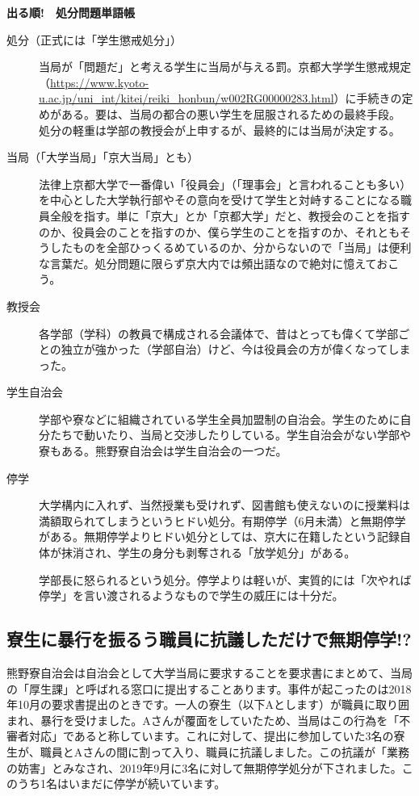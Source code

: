 \begin{shadebox}
{\large\textbf{出る順!　処分問題単語帳}}
\begin{description}
    \item[処分（正式には「学生懲戒処分」）] 当局が「問題だ」と考える学生に当局が与える罰。京都大学学生懲戒規定（\url{https://www.kyoto-u.ac.jp/uni_int/kitei/reiki_honbun/w002RG00000283.html}）に手続きの定めがある。要は、当局の都合の悪い学生を屈服されるための最終手段。 処分の軽重は学部の教授会が上申するが、最終的には当局が決定する。
    \item[当局（「大学当局」「京大当局」とも）] 法律上京都大学で一番偉い「役員会」（「理事会」と言われることも多い）を中心とした大学執行部やその意向を受けて学生と対峙することになる職員全般を指す。単に「京大」とか「京都大学」だと、教授会のことを指すのか、役員会のことを指すのか、僕ら学生のことを指すのか、それともそうしたものを全部ひっくるめているのか、分からないので「当局」は便利な言葉だ。処分問題に限らず京大内では頻出語なので絶対に憶えておこう。
    \item[教授会] 	各学部（学科）の教員で構成される会議体で、昔はとっても偉くて学部ごとの独立が強かった（学部自治）けど、今は役員会の方が偉くなってしまった。
    \item[学生自治会] 学部や寮などに組織されている学生全員加盟制の自治会。学生のために自分たちで動いたり、当局と交渉したりしている。学生自治会がない学部や寮もある。熊野寮自治会は学生自治会の一つだ。
    \item[停学] 大学構内に入れず、当然授業も受けれず、図書館も使えないのに授業料は満額取られてしまうというヒドい処分。有期停学（6月未満）と無期停学がある。無期停学よりヒドい処分としては、京大に在籍したという記録自体が抹消され、学生の身分も剥奪される「放学処分」がある。
    \item[] 学部長に怒られるという処分。停学よりは軽いが、実質的には「次やれば停学」を言い渡されるようなもので学生の威圧には十分だ。
\end{description}
\end{shadebox}


\subsection{寮生に暴行を振るう職員に抗議しただけで無期停学!?}
熊野寮自治会は自治会として大学当局に要求することを要求書にまとめて、当局の「厚生課」と呼ばれる窓口に提出することあります。事件が起こったのは2018年10月の要求書提出のときです。一人の寮生（以下Aとします）が職員に取り囲まれ、暴行を受けました。Aさんが覆面をしていたため、当局はこの行為を「不審者対応」であると称しています。これに対して、提出に参加していた3名の寮生が、職員とAさんの間に割って入り、職員に抗議しました。この抗議が「業務の妨害」とみなされ、2019年9月に3名に対して無期停学処分が下されました。このうち1名はいまだに停学が続いています。


